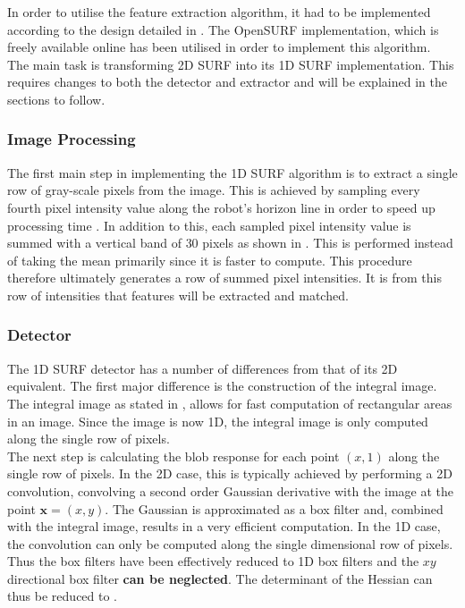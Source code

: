 \documentclass{article}
\begin{document}
In order to utilise the feature extraction algorithm, it had to be implemented according to the design detailed in \cite{Anderson}. The OpenSURF implementation, which is freely available online \cite{opensurf} has been utilised in order to implement this algorithm.\\

The main task is transforming 2D SURF into its 1D SURF implementation. This requires changes to both the detector and extractor and will be explained in the sections to follow.\\

\subsubsection{Image Processing}
\label{sec:imageProcessing}
The first main step in implementing the 1D SURF algorithm is to extract a single row of gray-scale pixels from the image. This is achieved by sampling every fourth pixel intensity value along the robot's horizon line in order to speed up processing time \cite{Anderson}. 
In addition to this, each sampled pixel intensity value is summed with a vertical band of $30$ pixels as shown in . This is performed instead of taking the mean primarily since it is faster to compute. This procedure therefore ultimately generates a row of summed pixel intensities. It is from this row of intensities that features will be extracted and matched.\\

\subsubsection{Detector}
\label{sec:1dsurfDetect}
The 1D SURF detector has a number of differences from that of its 2D equivalent. The first major difference is the construction of the integral image. The integral image as stated in , allows for fast computation of rectangular areas in an image. Since the image is now 1D, the integral image is only computed along the single row of pixels.\\ 

The next step is calculating the blob response for each point $(x,1)$ along the single row of pixels. In the 2D case, this is typically achieved by performing a 2D convolution, convolving a second order Gaussian derivative with the image at the point $\textbf{x} = (x,y)$. The Gaussian is approximated as a box filter and, combined with the integral image, results in a very efficient computation. In the 1D case, the convolution can only be computed along the single dimensional row of pixels. Thus the box filters have been effectively reduced to 1D box filters and the $xy$ directional box filter \textbf{can be neglected}. The determinant of the Hessian can thus be reduced to .\\
\end{document}
